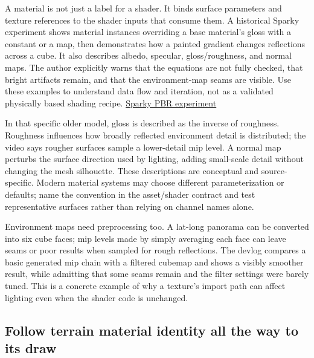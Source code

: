 \hypertarget{06-engine-ii-ch025-treat-materials-as-data-contracts-and-validate-the-lighting-behind-them}{}

A material is not just a label for a shader. It binds surface parameters and texture references to the shader inputs that consume them. A historical Sparky experiment shows material instances overriding a base material's gloss with a constant or a map, then demonstrates how a painted gradient changes reflections across a cube. It also describes albedo, specular, gloss/roughness, and normal maps. The author explicitly warns that the equations are not fully checked, that bright artifacts remain, and that the environment-map seams are visible. Use these examples to understand data flow and iteration, not as a validated physically based shading recipe. \href{https://www.youtube.com/watch?v=zqmgcQd6ayc&t=17m30s}{Sparky PBR experiment}

In that specific older model, gloss is described as the inverse of roughness. Roughness influences how broadly reflected environment detail is distributed; the video says rougher surfaces sample a lower-detail mip level. A normal map perturbs the surface direction used by lighting, adding small-scale detail without changing the mesh silhouette. These descriptions are conceptual and source-specific. Modern material systems may choose different parameterization or defaults; name the convention in the asset/shader contract and test representative surfaces rather than relying on channel names alone.

Environment maps need preprocessing too. A lat-long panorama can be converted into six cube faces; mip levels made by simply averaging each face can leave seams or poor results when sampled for rough reflections. The devlog compares a basic generated mip chain with a filtered cubemap and shows a visibly smoother result, while admitting that some seams remain and the filter settings were barely tuned. This is a concrete example of why a texture's import path can affect lighting even when the shader code is unchanged.

\subsection{Follow terrain material identity all the way to its draw}\label{06-engine-ii-ch025-follow-terrain-material-identity-all-the-way-to-its-draw}

\hypertarget{06-engine-ii-ch025-follow-terrain-material-identity-all-the-way-to-its-draw}{}

